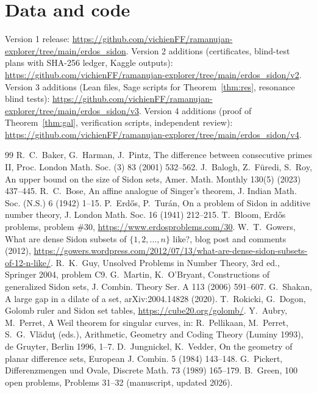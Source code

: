 \documentclass[11pt]{article}
\begin{document}
\section*{Data and code}
Version 1 release: \url{https://github.com/vichienFF/ramanujan-explorer/tree/main/erdos_sidon}. Version 2 additions (certificates,
blind-test plans with SHA-256 ledger, Kaggle outputs): \url{https://github.com/vichienFF/ramanujan-explorer/tree/main/erdos_sidon/v2}. Version 3 additions (Lean files, Sage scripts for Theorem~\ref{thm:res}, resonance blind tests): \url{https://github.com/vichienFF/ramanujan-explorer/tree/main/erdos_sidon/v3}. Version 4 additions (proof of Theorem~\ref{thm:gal}, verification scripts, independent review): \url{https://github.com/vichienFF/ramanujan-explorer/tree/main/erdos_sidon/v4}.

\begin{thebibliography}{99}
 R.~C.~Baker, G.~Harman, J.~Pintz, The difference between consecutive primes II, Proc. London Math. Soc. (3) 83 (2001) 532--562.
 J.~Balogh, Z.~F\"uredi, S.~Roy, An upper bound on the size of Sidon sets, Amer. Math. Monthly 130(5) (2023) 437--445.
 R.~C.~Bose, An affine analogue of Singer's theorem, J. Indian Math. Soc. (N.S.) 6 (1942) 1--15.
 P.~Erd\H{o}s, P.~Tur\'an, On a problem of Sidon in additive number theory, J. London Math. Soc. 16 (1941) 212--215.
 T.~Bloom, Erd\H{o}s problems, problem \#30, \url{https://www.erdosproblems.com/30}.
 W.~T.~Gowers, What are dense Sidon subsets of $\{1,2,\dots,n\}$ like?, blog post and comments (2012),
\url{https://gowers.wordpress.com/2012/07/13/what-are-dense-sidon-subsets-of-12-n-like/}.
 R.~K.~Guy, Unsolved Problems in Number Theory, 3rd ed., Springer 2004, problem C9.
 G.~Martin, K.~O'Bryant, Constructions of generalized Sidon sets, J. Combin. Theory Ser. A 113 (2006) 591--607.
 G.~Shakan, A large gap in a dilate of a set, arXiv:2004.14828 (2020).
 T.~Rokicki, G.~Dogon, Golomb ruler and Sidon set tables, \url{https://cube20.org/golomb/}.
 Y.~Aubry, M.~Perret, A Weil theorem for singular curves, in: R.~Pellikaan, M.~Perret, S.~G.~Vl\u{a}du\c{t} (eds.), Arithmetic, Geometry and Coding Theory (Luminy 1993), de Gruyter, Berlin 1996, 1--7.
 D.~Jungnickel, K.~Vedder, On the geometry of planar difference sets, European J. Combin. 5 (1984) 143--148.
 G.~Pickert, Differenzmengen und Ovale, Discrete Math. 73 (1989) 165--179.
 B.~Green, 100 open problems, Problems 31--32 (manuscript, updated 2026).

\end{thebibliography}
\end{document}

